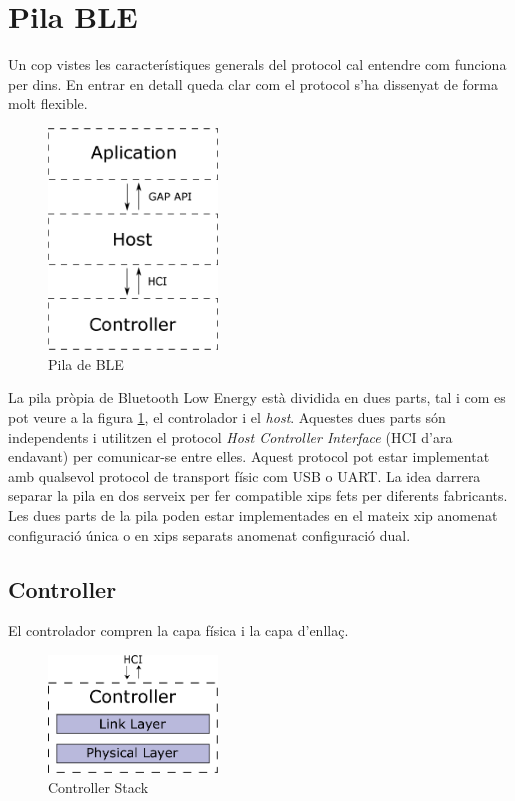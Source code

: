\section{Pila BLE}
Un cop vistes les característiques generals del protocol cal entendre com funciona per dins.
En entrar en detall queda clar com el protocol s'ha dissenyat de forma molt flexible.

\begin{figure}[h!]
	\begin{center}
		\includegraphics[width=0.4\textwidth]{./diagrames/BLE_Stack_Simplified}
		\caption{Pila de BLE}
		\label{ble_stack}
	\end{center}
\end{figure}

La pila pròpia de Bluetooth Low Energy està dividida en dues parts, tal i com es pot veure a la figura \ref{ble_stack}, el controlador i el \textit{host}. Aquestes dues parts són independents i utilitzen el protocol \textit{Host Controller Interface} (HCI d'ara endavant) per comunicar-se entre elles.
Aquest protocol pot estar implementat amb qualsevol protocol de transport físic com USB o UART.
La idea darrera separar la pila en dos serveix per fer compatible xips fets per diferents fabricants.
Les dues parts de la pila poden estar implementades en el mateix xip anomenat configuració única o en xips separats anomenat configuració dual.


\subsection{Controller}
El controlador compren la capa física i la capa d'enllaç.

\begin{figure}[h!]
	\begin{center}
		\includegraphics[width=0.4\textwidth]{./diagrames/BLE_Controller}
		\caption{Controller Stack}
	\end{center}
\end{figure}

